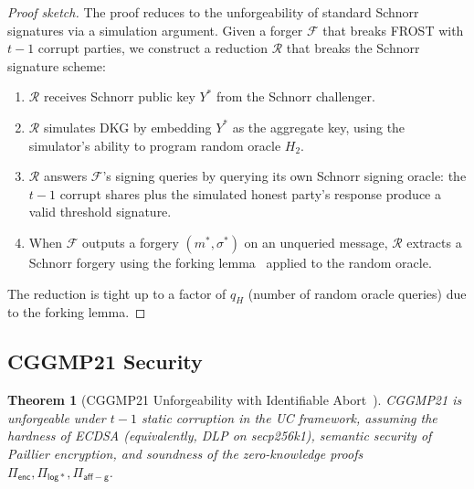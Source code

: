 \documentclass[11pt,twocolumn]{article}
\newtheorem{theorem}{Theorem}[section]
\begin{document}
\begin{proof}[Proof sketch]
The proof reduces to the unforgeability of standard Schnorr signatures via a
simulation argument. Given a forger $\mathcal{F}$ that breaks FROST with $t-1$
corrupt parties, we construct a reduction $\mathcal{R}$ that breaks the Schnorr
signature scheme:

\begin{enumerate}[nosep]
  \item $\mathcal{R}$ receives Schnorr public key $Y^*$ from the Schnorr challenger.
  \item $\mathcal{R}$ simulates DKG by embedding $Y^*$ as the aggregate key, using
    the simulator's ability to program random oracle $H_2$.
  \item $\mathcal{R}$ answers $\mathcal{F}$'s signing queries by querying its own
    Schnorr signing oracle: the $t-1$ corrupt shares plus the simulated honest
    party's response produce a valid threshold signature.
  \item When $\mathcal{F}$ outputs a forgery $(m^*, \sigma^*)$ on an unqueried
    message, $\mathcal{R}$ extracts a Schnorr forgery using the forking
    lemma~\cite{pointcheval1996} applied to the random oracle.
\end{enumerate}

The reduction is tight up to a factor of $q_H$ (number of random oracle queries) due
to the forking lemma.
\end{proof}

\subsection{CGGMP21 Security}

\begin{theorem}[CGGMP21 Unforgeability with Identifiable Abort~\cite{canetti2021cggmp}]
\label{thm:cggmp-uf}
CGGMP21 is unforgeable under $t{-}1$ static corruption in the UC framework,
assuming the hardness of ECDSA (equivalently, DLP on secp256k1), semantic security
of Paillier encryption, and soundness of the zero-knowledge proofs
$\Pi_{\mathsf{enc}}, \Pi_{\mathsf{log*}}, \Pi_{\mathsf{aff-g}}$.
\end{theorem}
\end{document}
